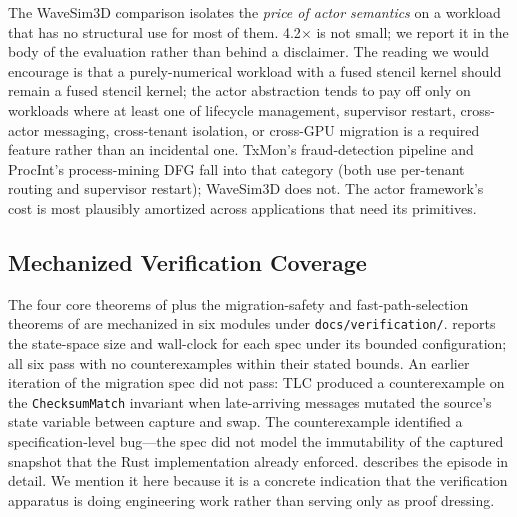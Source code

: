 The WaveSim3D comparison isolates the \emph{price of actor
semantics} on a workload that has no structural use for most of
them.  4.2$\times$ is not small; we report it in the body of the
evaluation rather than behind a disclaimer.  The reading we would
encourage is that a purely-numerical workload with a fused stencil
kernel should remain a fused stencil kernel; the actor abstraction
tends to pay off only on workloads where at least one of
lifecycle management, supervisor restart, cross-actor messaging,
cross-tenant isolation, or cross-GPU migration is a required
feature rather than an incidental one.  TxMon's fraud-detection
pipeline and ProcInt's process-mining DFG fall into that category
(both use per-tenant routing and supervisor restart); WaveSim3D
does not.  The actor framework's cost is most plausibly amortized
across applications that need its primitives.

\subsection{Mechanized Verification Coverage}
\label{sec:eval:tlc}

The four core theorems of 
plus the migration-safety and fast-path-selection theorems of
 are mechanized in six \TLA{} modules under
\texttt{docs/verification/}.   reports the
state-space size and wall-clock for each spec under its bounded
configuration; all six pass with no counterexamples within their
stated bounds.  An earlier iteration of the migration spec did not
pass: TLC produced a counterexample on the \texttt{ChecksumMatch}
invariant when late-arriving messages mutated the source's state
variable between capture and swap.  The counterexample identified a
specification-level bug—the spec did not model the immutability of
the captured snapshot that the Rust implementation already
enforced.   describes the episode in detail.
We mention it here because it is a concrete indication that the
verification apparatus is doing engineering work rather than
serving only as proof dressing.

